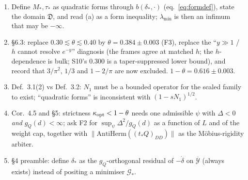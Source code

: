 \documentclass[11pt]{article}
\begin{document}
\begin{enumerate}[leftmargin=2.6em,itemsep=1pt,label=\textbf{R\arabic*.}]
 Record that they hold for the over-compression direction ($=2\lambda(1-\theta)g_Q(\dot\delta)>0$),
 so the completed criterion is (a) \emph{plus} an endpoint condition.
\item Define $M_*,\tau_*$ as quadratic forms through $b(\delta_*,\cdot)$ (eq.~\eqref{eq:formdef}),
 state the domain $\mathfrak D$, and read (a) as a form inequality; $\lambda_{\min}$ is then
 an infimum that may be $-\infty$.
\item \S6.3: replace $0.30\lesssim\theta\lesssim0.40$ by $\theta=0.384\pm0.003$ (F3),
 replace the ``$y\gg1$ / $h$ cannot resolve $e^{-y}$'' diagnosis (the frames agree at
 matched $h$; the $h$-dependence is bulk; S10's $0.300$ is a taper-suppressed lower bound),
 and record that $3/\pi^2$, $1/3$ and $1-2/\pi$ are now excluded.  $1-\theta=0.616\pm0.003$.
\item Def.~3.1(2) vs Def.~3.2: $N_1$ must be a bounded operator for the scaled family to
 exist; ``quadratic forms'' is inconsistent with $(1-sN_1)^{1/2}$.
\item Cor.~4.5 and \S5: strictness $\kappa_{\rm opt}<1-\theta$ needs one admissible $\psi$
 with $\Delta<0$ \emph{and} $g_Q(d)<\infty$; ask F2 for $\sup_\psi\Delta^2/g_Q(d)$ as a
 function of $L$ and of the weight cap, together with
 $\|\mathrm{AntiHerm}((t_*Q)_{DD})\|$ as the M\"obius-rigidity arbiter.
\item \S4 preamble: define $\delta_*$ as the $g_Q$-orthogonal residual of $-\dot\delta$ on
 $\overline{\mathcal Y}$ (always exists) instead of positing a minimiser $\mathcal G_*$.
\end{enumerate}
\end{document}
